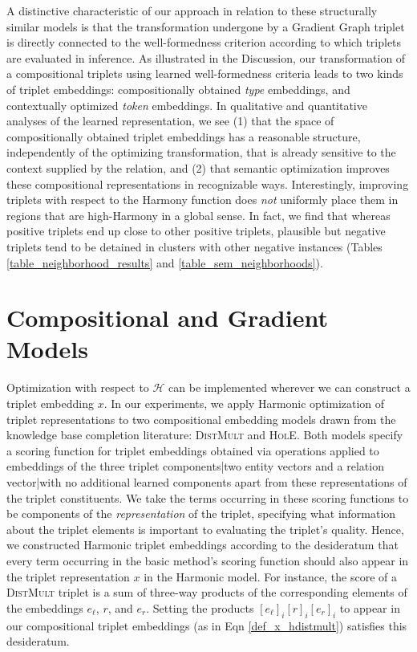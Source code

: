 \documentclass[a4paper,10pt]{article}
\begin{document}
A distinctive characteristic of our approach in relation to these structurally similar models is that the transformation undergone by a Gradient Graph triplet is directly connected to the well-formedness criterion according to which triplets are evaluated in inference. As illustrated in the Discussion, our transformation of a compositional triplets using learned well-formedness criteria leads to two kinds of triplet embeddings: compositionally obtained \emph{type} embeddings, and contextually optimized \emph{token} embeddings. In qualitative and quantitative analyses of the learned representation, we see (1) that the space of compositionally obtained triplet embeddings has a reasonable structure, independently of the optimizing transformation, that is already sensitive to the context supplied by the relation, and (2) that semantic optimization improves these compositional representations in recognizable ways. Interestingly, improving triplets with respect to the Harmony function does \emph{not} uniformly place them in regions that are high-Harmony in a global sense. In fact, we find that whereas positive triplets end up close to other positive triplets, plausible but negative triplets tend to be detained in clusters with other negative instances (Tables \ref{table_neighborhood_results} and \ref{table_sem_neighborhoods}). 

\section{Compositional and Gradient Models} \label{sec_models}

Optimization with respect to $\mathcal{H}$ can be implemented wherever we can construct a triplet embedding $x$. In our experiments, we apply Harmonic optimization of triplet representations to two compositional embedding models drawn from the knowledge base completion literature: \textsc{DistMult} and \textsc{HolE}. Both models specify a scoring function for triplet embeddings obtained via operations applied to embeddings of the three triplet components|two entity vectors and a relation vector|with no additional learned components apart from these representations of the triplet constituents. We take the terms occurring in these scoring functions to be components of the \emph{representation} of the triplet, specifying what information about the triplet elements is important to evaluating the triplet's quality. Hence, we constructed Harmonic triplet embeddings according to the desideratum that every term occurring in the basic method's scoring function should also appear in the triplet representation $x$ in the Harmonic model. 
For instance, the score of a \textsc{DistMult} triplet is a sum of three-way products of the corresponding elements of the embeddings $e_{\ell}$, $r$, and $e_r$. Setting the products $[e_\ell]_i [r]_i [e_r]_i$ to appear in our compositional triplet embeddings (as in Eqn \ref{def_x_hdistmult}) satisfies this desideratum. 
\end{document}
